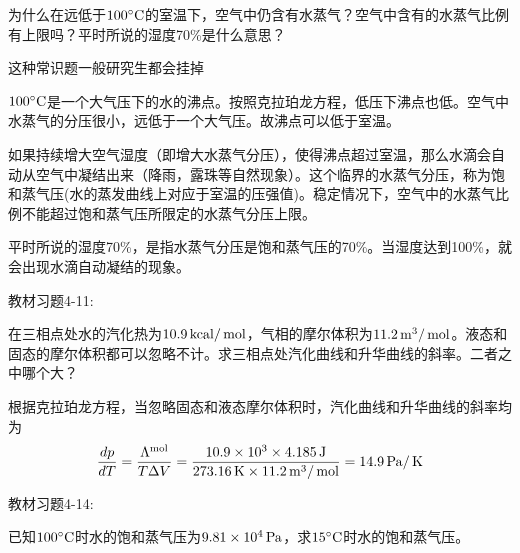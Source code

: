 \documentclass[CJK]{beamer}
\begin{document}
\begin{frame}
  \chtitle{\proid (\stwo)}
  \bch
  为什么在远低于$100^\circ \mathrm{C}$的室温下，空气中仍含有水蒸气？空气中含有的水蒸气比例有上限吗？平时所说的湿度70\%是什么意思？

  \skiplines

  \skiplines
  
  {\small 这种常识题一般研究生都会挂掉\huaixiao}
  
  \ech
\end{frame}


\begin{frame}
  \bch
  $100^\circ \mathrm{C}$是一个大气压下的水的沸点。按照克拉珀龙方程，低压下沸点也低。空气中水蒸气的分压很小，远低于一个大气压。故沸点可以低于室温。

  \skipline

  如果持续增大空气湿度（即增大水蒸气分压），使得沸点超过室温，那么水滴会自动从空气中凝结出来（降雨，露珠等自然现象）。这个临界的水蒸气分压，称为饱和蒸气压(水的蒸发曲线上对应于室温的压强值)。稳定情况下，空气中的水蒸气比例不能超过饱和蒸气压所限定的水蒸气分压上限。

  \skipline
  
  平时所说的湿度70\%，是指水蒸气分压是饱和蒸气压的70\%。当湿度达到100\%，就会出现水滴自动凝结的现象。
  \ech
\end{frame}


\begin{frame}
  \chtitle{\proid (\stwo)}
  \bch
  教材习题4-11:

  在三相点处水的汽化热为$10.9\,\mathrm{kcal}/\,\mathrm{mol}$，气相的摩尔体积为$11.2\,\mathrm{m}^3/\,\mathrm{mol}$。液态和固态的摩尔体积都可以忽略不计。求三相点处汽化曲线和升华曲线的斜率。二者之中哪个大？
  \ech
\end{frame}


\begin{frame}
  \bch
  根据克拉珀龙方程，当忽略固态和液态摩尔体积时，汽化曲线和升华曲线的斜率均为
  $$\frac{dp}{dT} = \frac{\Lambda^{\rm mol}}{T\Delta V} = \frac{10.9\times 10^3 \times 4.185 \,\mathrm{J}}{273.16\,\mathrm{K}\times 11.2\,\mathrm{m}^3/\,\mathrm{mol}} = 14.9 \,\mathrm{Pa}/\,\mathrm{K}$$
  \ech
\end{frame}


\begin{frame}
  \chtitle{\proid (\stwo)}
  \bch
  教材习题4-14:

  已知$100^\circ \mathrm{C}$时水的饱和蒸气压为$9.81\times 10^4 \,\mathrm{Pa}$，求$15^\circ \mathrm{C}$时水的饱和蒸气压。
  \ech
\end{frame}
\end{document}
